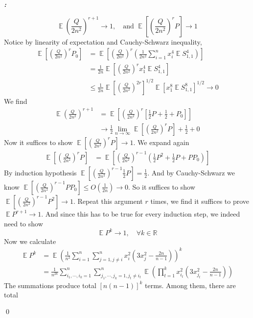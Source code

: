 \documentclass[12pt]{extarticle}
\renewenvironment{proof}[1][\proofname]{ { \it\bfseries #1: }}{\qed}
\newcommand{\field}[1]{\mathbb{#1}}
\newcommand{\R}{\field{R}}
\newcommand{\1}{\field{1}}
\DeclareMathOperator{\E}{\mathbb{E}}
\numberwithin{equation}{section}
\begin{document}
\begin{proof}
\begin{enumerate}[label={(\arabic*)}]
\[
\E \left(\frac{Q}{2n^2} \right)^{r+1} \to 1, \quad \text{and } \E \left[ \left(\frac{Q}{2n^2} \right)^r P \right] \to 1
\]
Notice by linearity of expectation and Cauchy-Schwarz inequality,
\begin{align*}
    \E \left[ \left(\frac{Q}{2n^2} \right)^r P_0 \right] 
    &= \E \left[ \left(\frac{Q}{2n^2} \right)^r \left(  \frac{1}{{2n^2}}\sum_{i=1}^n x_i^4\E S_{1,1}^4  \right) \right] \\
    & = \frac{1}{{2n}}\E \left[ \left(\frac{Q}{2n^2} \right)^r  x_1^4\E S_{1,1}^4  \right] \\
    & \le \frac{1}{{2n}}\E \left[ \left(\frac{Q}{2n^2} \right)^{2r} \right]^{1/2}  \E \left[ x_1^8\E S_{1,1}^8  \right]^{1/2}  \to 0
\end{align*}
We find 
\begin{align*}
    \E \left(\frac{Q}{2n^2} \right)^{r+1} 
    & = \E \left[ \left(\frac{Q}{2n^2} \right)^r \left[ \frac{1}{2}P +\frac{1}{2} + P_0 \right] \right]  \\ & \to \frac{1}{2} \lim_{n\to \infty} \E \left[ \left(\frac{Q}{2n^2} \right)^r P \right] + \frac{1}{2} +0
\end{align*}
Now it suffices to show $\E \left[ \left(\frac{Q}{2n^2} \right)^r P \right] \to 1$. We expand again
\begin{align*}
    \E \left[ \left(\frac{Q}{2n^2} \right)^r P \right]
    & = \E \left[ \left(\frac{Q}{2n^2} \right)^{r-1} \left( \frac{1}{2}P^2 + \frac{1}{2}P +PP_0 \right) \right]    
\end{align*}
By induction hypothesis 
$\E \left[ \left(\frac{Q}{2n^2} \right)^{r-1}  \frac{1}{2}P  \right] = \frac{1}{2} $. And by Cauchy-Schwarz we know  $\E \left[ \left(\frac{Q}{2n^2} \right)^{r-1} PP_0  \right] \le O(\frac{1}{2n}) \to 0$. So it suffices to show $\E \left[ \left(\frac{Q}{2n^2} \right)^{r-1} P^2 \right] \to 1$. Repeat this argument $r$ times, we find it suffices to prove $\E P^{r+1} \to 1$.
And since this has to be true for every induction step, we indeed need to show 
\[
\E P^{k} \to 1, \quad \forall k\in \R
\]
Now we calculate
\begin{align*}
    \E P^k & = \E \left(\frac{1}{n^2}\sum_{i=1}^n  \sum_{j=1, j\ne i}^n  x_i^2(3x_j^2-\frac{2n}{n-1})\right)^k \\
    & = \frac{1}{n^{2k}} \sum_{i_1,\cdots, i_k =1}^n \sum_{j_1,\cdots, j_k =1, j_t\ne i_t}^n  \E \left( \prod_{t=1}^k x_{i_t}^2(3x_{j_t}^2-\frac{2n}{n-1})\right)
\end{align*}
The summations produce total $[n(n-1)]^k$ terms. Among them, there are total 

\end{enumerate}
\end{proof}
\end{document}
